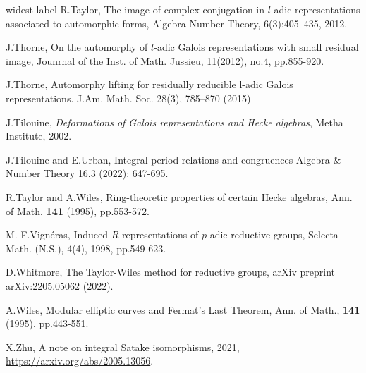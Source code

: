 \documentclass[12pt,oneside,reqno]{amsart}
\theoremstyle{plain}
\begin{document}
\begin{thebibliography}{widest-label}
		R.Taylor,
		The image of complex conjugation in $l$-adic representations associated to automorphic forms,
		Algebra Number Theory, 6(3):405–435, 2012.
		
		
		
		
		J.Thorne,
		On the automorphy of $l$-adic Galois
		representations with small residual image,
		Jounrnal of the Inst. of Math. Jussieu,
		11(2012),
		no.4,
		pp.855-920.
		
		
		
		J.Thorne,
		Automorphy lifting for residually reducible l-adic Galois representations.
		J.Am. Math. Soc. 28(3), 785–870 (2015)
		
		
		
		
		J.Tilouine,
		\textit{Deformations of Galois representations and
			Hecke algebras},
		Metha Institute, 2002.
		
		
		
		
		
		J.Tilouine and E.Urban,
		Integral period relations and congruences
		Algebra \& Number Theory 16.3 (2022): 647-695.
		
		
		
		R.Taylor and A.Wiles,
		Ring-theoretic properties of certain Hecke algebras,
		Ann. of Math.
		\textbf{141}
		(1995),
		pp.553-572.
		
		
		
		M.-F.Vign\'{e}ras,
		Induced $R$-representations of $p$-adic reductive groups,
		Selecta Math.
		(N.S.),
		4(4),
		1998,
		pp.549-623.
		
		
		
		D.Whitmore,
		The Taylor-Wiles method for reductive groups,
		arXiv preprint arXiv:2205.05062 (2022).
		
		
		
		A.Wiles,
		Modular elliptic curves and Fermat's Last Theorem,
		Ann. of Math.,
		\textbf{141}
		(1995),
		pp.443-551.
		
		
		
		
		
		
		
		
		
		
		
		
		X.Zhu,
		A note on integral Satake isomorphisms, 2021,
		\url{https://arxiv.org/abs/2005.13056}.
		
		
		
	\end{thebibliography}
	
\end{document}
